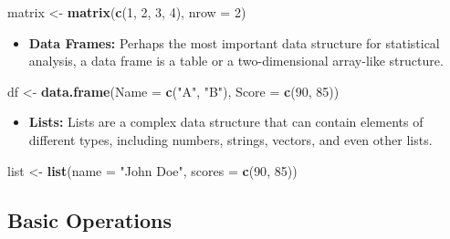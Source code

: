\documentclass[
]{book}
\newenvironment{Shaded}{\begin{snugshade}}{\end{snugshade}}
\newcommand{\AttributeTok}[1]{\textcolor[rgb]{0.13,0.29,0.53}{#1}}
\newcommand{\DecValTok}[1]{\textcolor[rgb]{0.00,0.00,0.81}{#1}}
\newcommand{\FunctionTok}[1]{\textcolor[rgb]{0.13,0.29,0.53}{\textbf{#1}}}
\newcommand{\NormalTok}[1]{#1}
\newcommand{\OtherTok}[1]{\textcolor[rgb]{0.56,0.35,0.01}{#1}}
\newcommand{\StringTok}[1]{\textcolor[rgb]{0.31,0.60,0.02}{#1}}
\providecommand{\tightlist}{%
  \setlength{\itemsep}{0pt}\setlength{\parskip}{0pt}}
\begin{document}
\begin{Shaded}
\begin{Highlighting}[]
\NormalTok{matrix }\OtherTok{\textless{}{-}} \FunctionTok{matrix}\NormalTok{(}\FunctionTok{c}\NormalTok{(}\DecValTok{1}\NormalTok{, }\DecValTok{2}\NormalTok{, }\DecValTok{3}\NormalTok{, }\DecValTok{4}\NormalTok{), }\AttributeTok{nrow =} \DecValTok{2}\NormalTok{)}
\end{Highlighting}
\end{Shaded}

\begin{itemize}
\tightlist
\item
  \textbf{Data Frames:} Perhaps the most important data structure for statistical analysis, a data frame is a table or a two-dimensional array-like structure.
\end{itemize}

\begin{Shaded}
\begin{Highlighting}[]
\NormalTok{df }\OtherTok{\textless{}{-}} \FunctionTok{data.frame}\NormalTok{(}\AttributeTok{Name =} \FunctionTok{c}\NormalTok{(}\StringTok{"A"}\NormalTok{, }\StringTok{"B"}\NormalTok{), }\AttributeTok{Score =} \FunctionTok{c}\NormalTok{(}\DecValTok{90}\NormalTok{, }\DecValTok{85}\NormalTok{))}
\end{Highlighting}
\end{Shaded}

\begin{itemize}
\tightlist
\item
  \textbf{Lists:} Lists are a complex data structure that can contain elements of different types, including numbers, strings, vectors, and even other lists.
\end{itemize}

\begin{Shaded}
\begin{Highlighting}[]
\NormalTok{list }\OtherTok{\textless{}{-}} \FunctionTok{list}\NormalTok{(}\AttributeTok{name =} \StringTok{"John Doe"}\NormalTok{, }\AttributeTok{scores =} \FunctionTok{c}\NormalTok{(}\DecValTok{90}\NormalTok{, }\DecValTok{85}\NormalTok{))}
\end{Highlighting}
\end{Shaded}

\hypertarget{basic-operations}{%
\subsection*{Basic Operations}\label{basic-operations}}
\end{document}
